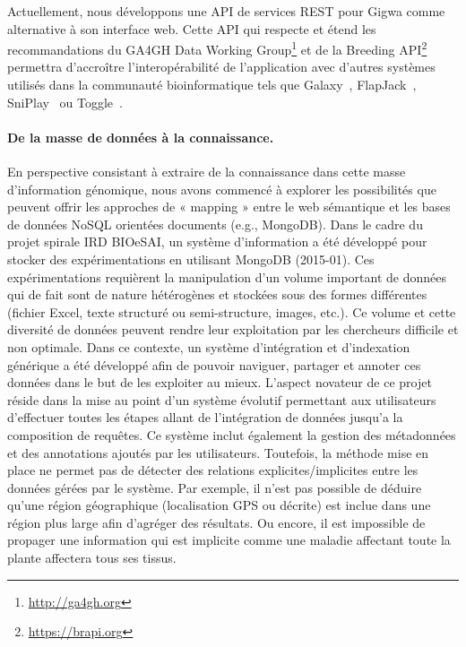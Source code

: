 Actuellement, nous développons une API de services REST pour Gigwa comme alternative à son interface web. Cette API qui respecte et étend les recommandations du GA4GH Data Working Group\footnote{\url{http://ga4gh.org}} et de la Breeding API\footnote{\url{https://brapi.org}} permettra d’accroître l’interopérabilité de l’application avec d’autres systèmes utilisés dans la communauté bioinformatique tels que Galaxy~\cite{Giardine2005,Goecks2010}, FlapJack~\cite{Milne2010}, SniPlay~\cite{Dereeper2015} ou Toggle~\cite{Monat2015}.

\paragraph*{De la masse de données à la connaissance.}
En perspective consistant à extraire de la connaissance dans cette masse d’information génomique, nous avons commencé à explorer les possibilités que peuvent offrir les approches de « mapping » entre le web sémantique et les bases de données NoSQL orientées documents (e.g., MongoDB). Dans le cadre du projet spirale IRD BIOeSAI, un système d’information a été développé pour stocker des expérimentations en utilisant MongoDB (2015-01). Ces expérimentations requièrent la manipulation d’un volume important de données qui de fait sont de nature hétérogènes et stockées sous des formes différentes (fichier Excel, texte structuré ou semi-structure, images, etc.). Ce volume et cette diversité de données peuvent rendre leur exploitation par les chercheurs difficile et non optimale. Dans ce contexte, un système d’intégration et d'indexation générique a été développé afin de pouvoir naviguer, partager et annoter ces données dans le but de les exploiter au mieux. L'aspect novateur de ce projet réside dans la mise au point d'un système évolutif permettant aux utilisateurs d’effectuer toutes les étapes allant de l’intégration de données jusqu’a la composition de requêtes. Ce système inclut également la gestion des métadonnées et des annotations ajoutés par les utilisateurs. Toutefois, la méthode mise en place ne permet pas de détecter des relations explicites/implicites entre les données gérées par le système.  Par exemple, il n’est pas possible de déduire qu’une région géographique (localisation GPS ou décrite) est inclue dans une région plus large afin d’agréger des résultats. Ou encore, il est impossible de propager une information qui est implicite comme une maladie affectant toute la plante affectera tous ses tissus. \\

